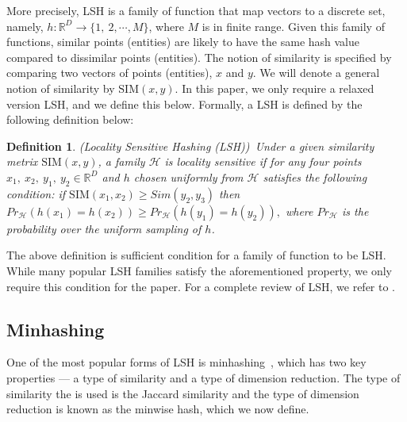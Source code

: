 \documentclass[aoas]{imsart}
\newtheorem{definition}{Definition}
\begin{document}
More precisely, LSH is a family of function that map vectors to a discrete set, namely, $h:\mathbb{R}^D \rightarrow \{1, \ 2,\cdots , M\}$, where $M$ is in finite range. Given this family of functions, similar points (entities) are likely to have the same hash value compared to dissimilar points (entities). The notion of similarity is specified by comparing two vectors of points (entities), $x$ and $y.$ We will denote a general notion of similarity by $\text{SIM}({x,y}).$ In this paper, we only require a relaxed version LSH, and we define this below. Formally, a LSH is defined by the following definition below:
\begin{definition} (Locality Sensitive Hashing (LSH))\ Under a given similarity metrix $\text{SIM}(x,y)$, a family $\mathcal{H}$ is locality sensitive if for any four points $x_1, \ x_2, \ y_1, \ y_2 \in \mathbb{R}^D$  and $h$ chosen uniformly from $\mathcal{H}$ satisfies the following condition: if $\text{SIM}(x_1,x_2)\ge Sim(y_2,y_3)$ then ${Pr}_\mathcal{H}(h(x_1) = h(x_2)) \ge {Pr}_\mathcal{H}(h(y_1) = h(y_2)),$ where ${Pr}_\mathcal{H}$ is the probability over the uniform sampling of $h$.
\end{definition}
The above definition is sufficient condition for a family of function to be LSH. While many popular LSH families satisfy the aforementioned property, we only require this condition for the paper. For a complete review of LSH, we refer to \cite{rajaraman_2012}.




\subsection{Minhashing}
One of the most popular forms of LSH is minhashing~\cite{Proc:Broder}, which has two key properties --- a type of similarity and a type of dimension reduction. The type of similarity the is used is the Jaccard similarity and the type of dimension reduction is known as the minwise hash, which we now define.
\end{document}
